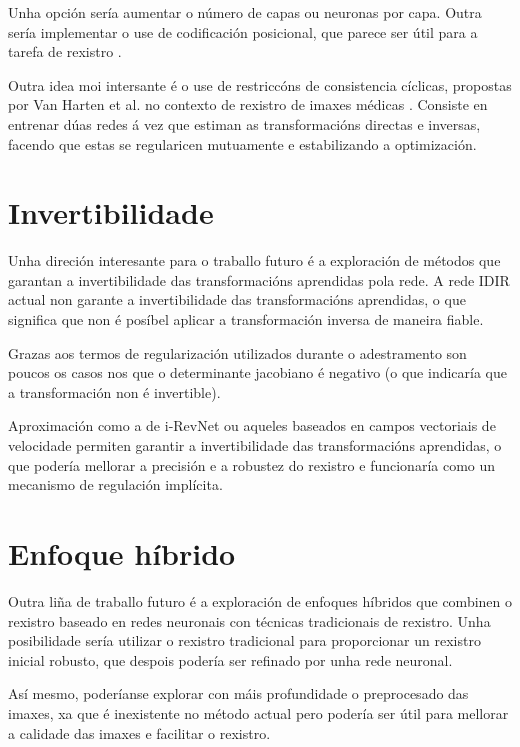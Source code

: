 Unha opción sería aumentar o número de capas ou neuronas por capa. Outra sería implementar o use de codificación posicional, que parece ser útil para a tarefa de rexistro \cite{mueller2022instant}.

Outra idea moi intersante é o use de restriccóns de consistencia cíclicas, propostas por Van Harten et al. no contexto de rexistro de imaxes médicas \cite{van_Harten_2024}. Consiste en entrenar dúas redes á vez que estiman as transformacións directas e inversas, facendo que estas se regularicen mutuamente e estabilizando a optimización.

\section{Invertibilidade}
\label{sec:Invertibilidade}

Unha direción interesante para o traballo futuro é a exploración de métodos que garantan a invertibilidade das transformacións aprendidas pola rede.
A rede IDIR actual non garante a invertibilidade das transformacións aprendidas, o que significa que non é posíbel aplicar a transformación inversa de maneira fiable.

Grazas aos termos de regularización utilizados durante o adestramento son poucos os casos nos que o determinante jacobiano é negativo (o que indicaría que a transformación non é invertible).

Aproximación como a de i-RevNet \cite{jacobsen2018irevnetdeepinvertiblenetworks} ou aqueles baseados en campos vectoriais de velocidade \cite{sun2024medicalimageregistrationneural} permiten garantir a invertibilidade das transformacións aprendidas, o que podería mellorar a precisión e a robustez do rexistro e funcionaría como un mecanismo de regulación implícita.

\section{Enfoque híbrido}
\label{sec:Enfoque híbrido}

Outra liña de traballo futuro é a exploración de enfoques híbridos que combinen o rexistro baseado en redes neuronais con técnicas tradicionais de rexistro.
Unha posibilidade sería utilizar o rexistro tradicional para proporcionar un rexistro inicial robusto, que despois podería ser refinado por unha rede neuronal.

Así mesmo, poderíanse explorar con máis profundidade o preprocesado das imaxes, xa que é inexistente no método actual pero podería ser útil para mellorar a calidade das imaxes e facilitar o rexistro.